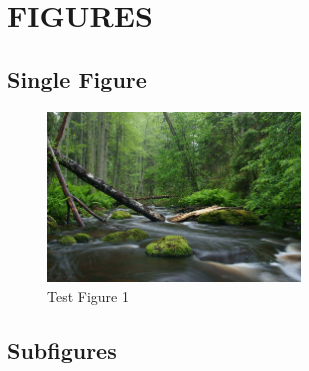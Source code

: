 \documentclass[a4paper,12pt]{article}
\begin{document}
\section{FIGURES}

\subsection{Single Figure}

\lipsum[1]

\begin{figure}[htbp]
    \centering
    \includegraphics[width=0.6\textwidth]{Graph/test}
    \caption{Test Figure 1}
    \label{fig1}
\end{figure}


\subsection{Subfigures}

\lipsum[1]
\end{document}
